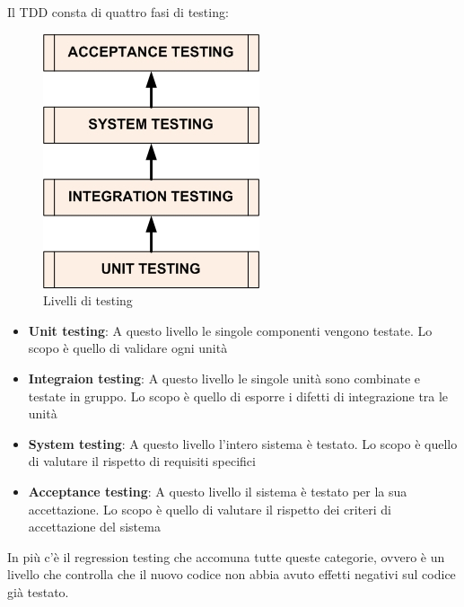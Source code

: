 \documentclass[11pt,a4paper]{book}
\begin{document}
Il TDD consta di quattro fasi di testing:
\begin{figure}[h!]
	\begin{center}
		\includegraphics[scale=0.6]{img/002.jpg}
		\caption{Livelli di testing}
		\label{fig: 002}
	\end{center}
\end{figure}
\begin{itemize}
	\item \textbf{Unit testing}: A questo livello le singole componenti vengono testate. Lo scopo è quello di validare ogni unità
	\item \textbf{Integraion testing}: A questo livello le singole unità sono combinate e testate in gruppo. Lo scopo è quello di esporre i difetti di integrazione tra le unità
	\item \textbf{System testing}: A questo livello l'intero sistema è testato. Lo scopo è quello di valutare il rispetto di requisiti specifici	
	\item \textbf{Acceptance testing}: A questo livello il sistema è testato per la sua accettazione. Lo scopo è quello di valutare il rispetto dei criteri di accettazione del sistema	 
\end{itemize}

In più c'è il regression testing che accomuna tutte queste categorie, ovvero è un livello che controlla che il nuovo codice non abbia avuto effetti negativi sul codice già testato.
\end{document}
